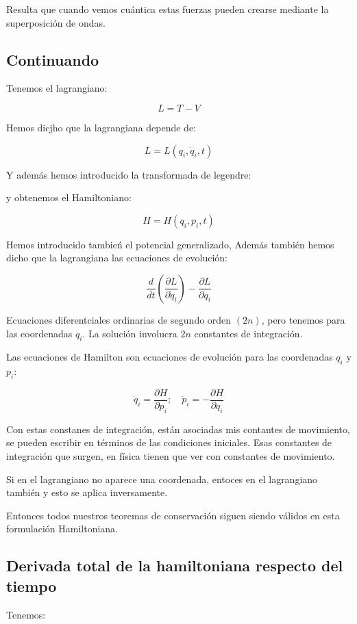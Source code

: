 \documentclass{article}
\begin{document}
Resulta que cuando vemos cuántica estas fuerzas pueden crearse mediante la superposición de ondas. 

\subsection{Continuando}

Tenemos el lagrangiano:

\[ L = T-V \]

Hemos dicjho que la lagrangiana depende de:


\[ L = L(q_{i},\dot{q}_{i},t)  \]

Y además hemos introducido la transformada de legendre:

y obtenemos el Hamiltoniano:


\[ H = H(q_{i}, p_{i},t)       \]

Hemos introducido tambień el potencial generalizado, Además también hemos dicho que la lagrangiana las ecuaciones de evolución:


\[ \frac{d}{dt} \left(  \frac{\partial L}{\partial \dot{q}_{i}} \right)-\frac{\partial L}{\partial q_{i}}  \]

Ecuaciones diferentciales ordinarias de segundo orden $(2n)$, pero tenemos para las coordenadas $q_{i}$. La solución involucra $2n$ constantes de integración.

Las ecuaciones de Hamilton son ecuaciones de evolución para las coordenadas $q_{i}$ y $p_{i}$:

\[ \dot{q}_{i} = \frac{\partial H }{\partial p_{i}}; \quad \dot{p}_{i} = - \frac{\partial H}{\partial q_{i}}  \]

Con estas constanes de integración, están asociadas mis contantes de movimiento, se pueden escribir en términos de las condiciones iniciales. Esas constantes de integración que surgen, en física tienen que ver con constantes de movimiento.




Si en el lagrangiano no aparece una coordenada, entoces en el lagrangiano también y esto se aplica inversamente.

Entonces todos nuestros teoremas de conservación siguen siendo válidos en esta formulación Hamiltoniana.


\subsection{Derivada total de la hamiltoniana respecto del tiempo}


Tenemos:
\end{document}

